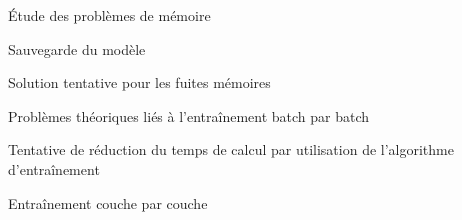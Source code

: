 \newpage
\begin{report}{Étude des problèmes de mémoire}\label{subsec:memuse}
	
\end{report}
\begin{report}{Sauvegarde du modèle}\label{subsec:save}
	
\end{report}
\begin{report}{Solution tentative pour les fuites mémoires}\label{subsec:memleak}\label{subsec:hist}
	
\end{report}
\begin{report}{Problèmes théoriques liés à l'entraînement batch par batch}\label{subsec:batch}
	
\end{report}
\begin{report}{Tentative de réduction du temps de calcul par utilisation de l'algorithme d'entraînement \og{}\fg{}}\label{subsec:tbptt}
	
\end{report}
\begin{report}{Entraînement couche par couche}\label{subsec:lbl}
	
\end{report}


